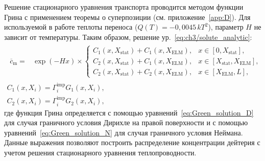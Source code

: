 Решение стационарного уравнения транспорта проводится методом функции Грина с применением теоремы о суперпозиции (см. приложение~\cref{app:D}). Для используемой в работе теплоты переноса ($Q(T)=-0,0045\,kT^2$), параметр $H$ не зависит от температуры. Таким образом, решение ур.~\cref{eq:ch3/solute_analytic}:
\begin{subequations}
	\begin{gather}
	\label{eq:ss_solution}
	\begin{array}{ll}
		\overline{c}_{\mathrm{m}}=&\exp\left(-Hx\right)\times
			\begin{cases}
			C_1(x,X_{\mathrm{stat}})+C_1(x,X_{\mathrm{ELM}}), & x \in [0,X_{\mathrm{stat}}],\\
			C_2(x,X_{\mathrm{stat}})+C_1(x,X_{\mathrm{ELM}}), & x \in [X_{\mathrm{stat}},X_{\mathrm{ELM}}],\\
			C_2(x,X_{\mathrm{stat}})+C_2(x,X_{\mathrm{ELM}}), & x\in [X_{\mathrm{ELM}}, L],
			\end{cases}
	\end{array}\\
	C_1(x,X_i)=\Gamma_i^{\mathrm{imp}}G_1(x,X_i),\\
	C_2(x,X_i)=\Gamma_i^{\mathrm{imp}}G_2(x,X_i),
	\end{gather}
\end{subequations}
где функция Грина определяется с помощью уравнений~\cref{eq:Green_solution_D} для случая граничного условия Дирихле на правой поверхности и с помощью уравнений~\cref{eq:Green_solution_N} для случая граничного условия Неймана. Данные выражения позволяют построить распределение концентрации дейтерия с учетом решения стационарного уравнения теплопроводности.

